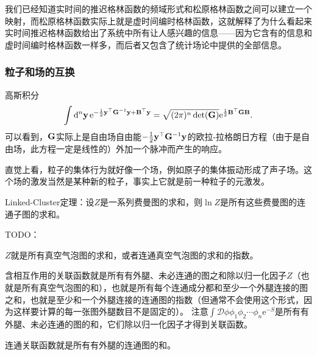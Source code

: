 \documentclass[hyperref, UTF8, a4paper]{ctexart}
\newcommand*{\ee}{\mathrm{e}}
\newcommand*{\fd}[1]{\mathcal{D}{#1}}
\begin{document}
我们已经知道实时间的推迟格林函数的频域形式和松原格林函数之间可以建立一个映射，而松原格林函数实际上就是虚时间编时格林函数，这就解释了为什么看起来实时间推迟格林函数给出了系统中所有让人感兴趣的信息——因为它含有的信息和虚时间编时格林函数一样多，而后者又包含了统计场论中提供的全部信息。

\subsubsection{粒子和场的互换}

高斯积分
\begin{equation}
    \int \dd[n]{\vb{y}} \ee^{-\frac{1}{2} \vb{y}^\top \vb{G}^{-1} \vb{y} + \vb{B}^\top \vb{y}} = \sqrt{(2\pi)^n \det(\vb{G})} \ee^{\frac{1}{2} \vb{B}^\top \vb{G} \vb{B}}.
\end{equation}
可以看到，$\vb{G}$实际上是自由场自由能$-\frac{1}{2} \vb{y}^\top \vb{G}^{-1} \vb{y}$的欧拉-拉格朗日方程（由于是自由场，此方程一定是线性的）外加一个脉冲而产生的响应。

直觉上看，粒子的集体行为就好像一个场，例如原子的集体振动形成了声子场。这个场的激发当然是某种新的粒子，事实上它就是前一种粒子的元激发。

Linked-Cluster定理：设$Z$是一系列费曼图的求和，则$\ln Z$是所有这些费曼图的连通子图的求和。

TODO：

$Z$就是所有真空气泡图的求和，或者连通真空气泡图的求和的指数。

含相互作用的关联函数就是所有有外腿、未必连通的图之和除以归一化因子$Z$（也就是所有真空气泡图的和），也就是所有每个连通成分都和至少一个外腿连接的图之和，也就是至少和一个外腿连接的连通图的指数（但通常不会使用这个形式，因为这样要计算的每一张图外腿数目不是固定的）。
注意$\int \fd{\phi} \phi_1 \phi_2 \cdots \phi_n \ee^{-S}$是所有有外腿、未必连通的图的和，它们除以归一化因子才得到关联函数。

连通关联函数就是所有有外腿的连通图的和。
\end{document}
